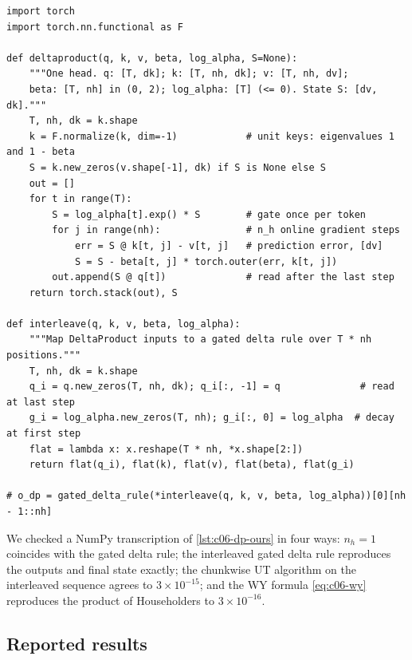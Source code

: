 \begin{lstlisting}[caption={Reference implementation (ours): DeltaProduct recurrence and the interleaving map},label={lst:c06-dp-ours}]
import torch
import torch.nn.functional as F

def deltaproduct(q, k, v, beta, log_alpha, S=None):
    """One head. q: [T, dk]; k: [T, nh, dk]; v: [T, nh, dv];
    beta: [T, nh] in (0, 2); log_alpha: [T] (<= 0). State S: [dv, dk]."""
    T, nh, dk = k.shape
    k = F.normalize(k, dim=-1)            # unit keys: eigenvalues 1 and 1 - beta
    S = k.new_zeros(v.shape[-1], dk) if S is None else S
    out = []
    for t in range(T):
        S = log_alpha[t].exp() * S        # gate once per token
        for j in range(nh):               # n_h online gradient steps
            err = S @ k[t, j] - v[t, j]   # prediction error, [dv]
            S = S - beta[t, j] * torch.outer(err, k[t, j])
        out.append(S @ q[t])              # read after the last step
    return torch.stack(out), S

def interleave(q, k, v, beta, log_alpha):
    """Map DeltaProduct inputs to a gated delta rule over T * nh positions."""
    T, nh, dk = k.shape
    q_i = q.new_zeros(T, nh, dk); q_i[:, -1] = q              # read at last step
    g_i = log_alpha.new_zeros(T, nh); g_i[:, 0] = log_alpha  # decay at first step
    flat = lambda x: x.reshape(T * nh, *x.shape[2:])
    return flat(q_i), flat(k), flat(v), flat(beta), flat(g_i)

# o_dp = gated_delta_rule(*interleave(q, k, v, beta, log_alpha))[0][nh - 1::nh]
\end{lstlisting}

We checked a NumPy transcription of \cref{lst:c06-dp-ours} in four ways: $n_h=1$ coincides
with the gated delta rule; the interleaved gated delta rule reproduces the outputs and
final state exactly; the chunkwise UT algorithm on the interleaved sequence agrees to
$3\times10^{-15}$; and the WY formula \eqref{eq:c06-wy} reproduces the product of
Householders to $3\times10^{-16}$.

\subsection{Reported results}\label{sec:c06-dp-results}

